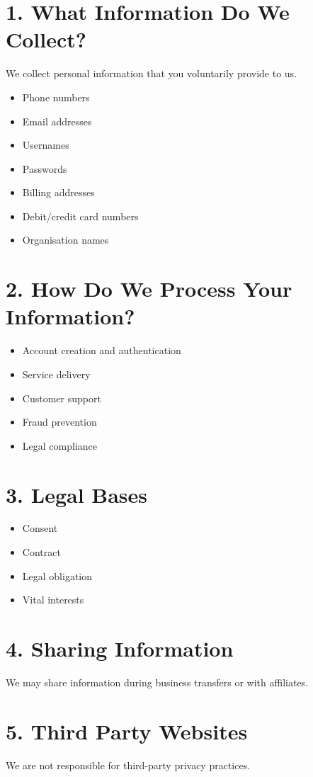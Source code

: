 \documentclass[11pt, a4paper]{report}
\begin{document}
\section*{1. What Information Do We Collect?}
We collect personal information that you voluntarily provide to us.

\begin{itemize}
	\item Phone numbers
	\item Email addresses
	\item Usernames
	\item Passwords
	\item Billing addresses
	\item Debit/credit card numbers
	\item Organisation names
\end{itemize}

\section*{2. How Do We Process Your Information?}
\begin{itemize}
	\item Account creation and authentication
	\item Service delivery
	\item Customer support
	\item Fraud prevention
	\item Legal compliance
\end{itemize}

\section*{3. Legal Bases}
\begin{itemize}
	\item Consent
	\item Contract
	\item Legal obligation
	\item Vital interests
\end{itemize}

\section*{4. Sharing Information}
We may share information during business transfers or with affiliates.

\section*{5. Third Party Websites}
We are not responsible for third-party privacy practices.
\end{document}
